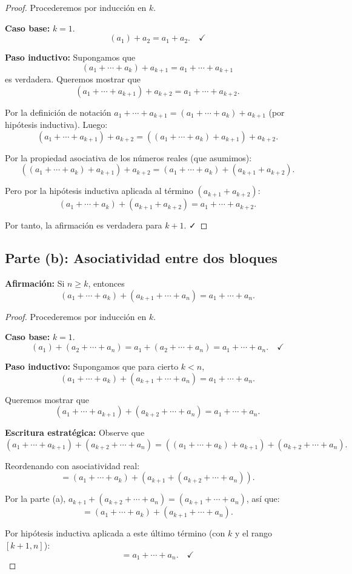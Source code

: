 \begin{proof}
Procederemos por inducción en $k$.

\textbf{Caso base: } $k = 1$.
\[
(a_1) + a_2 = a_1 + a_2. \quad \checkmark
\]

\textbf{Paso inductivo:} Supongamos que 
\[
(a_1 + \cdots + a_k) + a_{k+1} = a_1 + \cdots + a_{k+1}
\]
es verdadera. Queremos mostrar que
\[
(a_1 + \cdots + a_{k+1}) + a_{k+2} = a_1 + \cdots + a_{k+2}.
\]

Por la definición de notación $a_1 + \cdots + a_{k+1} = (a_1 + \cdots + a_k) + a_{k+1}$ (por hipótesis inductiva). Luego:
\[
(a_1 + \cdots + a_{k+1}) + a_{k+2} = ((a_1 + \cdots + a_k) + a_{k+1}) + a_{k+2}.
\]

Por la propiedad asociativa de los números reales (que asumimos):
\[
((a_1 + \cdots + a_k) + a_{k+1}) + a_{k+2} = (a_1 + \cdots + a_k) + (a_{k+1} + a_{k+2}).
\]

Pero por la hipótesis inductiva aplicada al término $(a_{k+1} + a_{k+2})$:
\[
(a_1 + \cdots + a_k) + (a_{k+1} + a_{k+2}) = a_1 + \cdots + a_{k+2}.
\]

Por tanto, la afirmación es verdadera para $k+1$. ✓
\end{proof}

\subsection*{Parte (b): Asociatividad entre dos bloques}

\textbf{Afirmación:} Si $n \geq k$, entonces
\[
(a_1 + \cdots + a_k) + (a_{k+1} + \cdots + a_n) = a_1 + \cdots + a_n.
\]

\begin{proof}
Procederemos por inducción en $k$.

\textbf{Caso base: } $k = 1$.
\[
(a_1) + (a_2 + \cdots + a_n) = a_1 + (a_2 + \cdots + a_n) = a_1 + \cdots + a_n. \quad \checkmark
\]

\textbf{Paso inductivo:} Supongamos que para cierto $k < n$,
\[
(a_1 + \cdots + a_k) + (a_{k+1} + \cdots + a_n) = a_1 + \cdots + a_n.
\]

Queremos mostrar que
\[
(a_1 + \cdots + a_{k+1}) + (a_{k+2} + \cdots + a_n) = a_1 + \cdots + a_n.
\]

\textbf{Escritura estratégica:} Observe que
\[
(a_1 + \cdots + a_{k+1}) + (a_{k+2} + \cdots + a_n) = ((a_1 + \cdots + a_k) + a_{k+1}) + (a_{k+2} + \cdots + a_n).
\]

Reordenando con asociatividad real:
\[
= (a_1 + \cdots + a_k) + (a_{k+1} + (a_{k+2} + \cdots + a_n)).
\]

Por la parte (a), $a_{k+1} + (a_{k+2} + \cdots + a_n) = (a_{k+1} + \cdots + a_n)$, así que:
\[
= (a_1 + \cdots + a_k) + (a_{k+1} + \cdots + a_n).
\]

Por hipótesis inductiva aplicada a este último término (con $k$ y el rango $[k+1, n]$):
\[
= a_1 + \cdots + a_n. \quad \checkmark
\]
\end{proof}

